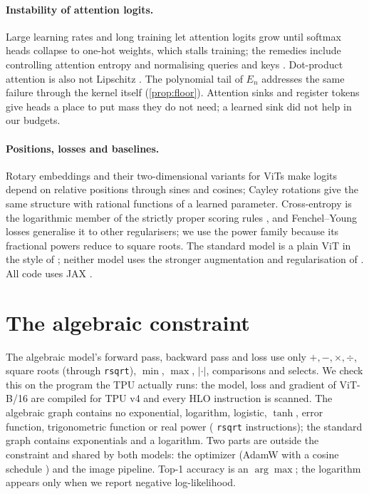 \documentclass[10pt]{article}
\begin{document}
\paragraph{Instability of attention logits.} Large learning rates and long
training let attention logits grow until softmax heads collapse to one-hot
weights, which stalls training; the remedies include controlling attention
entropy \cite{zhai2023entropy} and normalising queries and keys
\cite{dehghani2023vit22b}. Dot-product attention is also not Lipschitz
\cite{kim2021lipschitz}. The polynomial tail of $E_n$ addresses the same
failure through the kernel itself (\cref{prop:floor}). Attention sinks and
register tokens \cite{darcet2024registers} give heads a place to put mass
they do not need; a learned sink did not help in our budgets.

\paragraph{Positions, losses and baselines.} Rotary embeddings
\cite{su2021roformer} and their two-dimensional variants for ViTs
\cite{heo2024ropevit} make logits depend on relative positions through
sines and cosines; Cayley rotations give the same structure with rational
functions of a learned parameter. Cross-entropy is the logarithmic member of
the strictly proper scoring rules \cite{gneiting2007scoring}, and
Fenchel--Young losses \cite{blondel2020fy} generalise it to other
regularisers; we use the power family because its fractional powers reduce
to square roots. The standard model is a plain ViT in the style of
\cite{dosovitskiy2021vit,beyer2022plain}; neither model uses the stronger
augmentation and regularisation of \cite{touvron2021deit}. All code uses
JAX \cite{jax2018github}.

\section{The algebraic constraint}
\label{sec:constraint}

The algebraic model's forward pass, backward pass and loss use only
$+,-,\times,\div$, square roots (through \texttt{rsqrt}), $\min$, $\max$,
$|\cdot|$, comparisons and selects. We check this on the program the TPU
actually runs: the model, loss and gradient of ViT-B/16 are compiled for TPU
v4 and every HLO instruction is scanned. The algebraic graph contains no
exponential, logarithm, logistic, $\tanh$, error function, trigonometric
function or real power (\purityRsqrt{} \texttt{rsqrt} instructions); the
standard graph contains \purityStdExp{} exponentials and a logarithm. Two
parts are outside the constraint and shared by both models: the optimizer
(AdamW with a cosine schedule \cite{loshchilov2019adamw}) and the image
pipeline. Top-1 accuracy is an $\arg\max$; the logarithm appears only when we
report negative log-likelihood.
\end{document}
